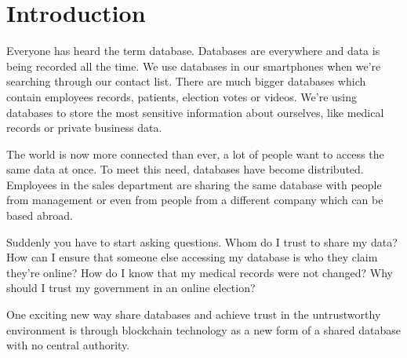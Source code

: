 \chapter*{Introduction}

Everyone has heard the term database. Databases are everywhere and data is being recorded all the time. We use databases in our smartphones when we're searching through our contact list. There are much bigger databases which contain employees records, patients, election votes or videos. We're using databases to store the most sensitive information about ourselves, like medical records or private business data. 

The world is now more connected than ever, a lot of people want to access the same data at once. To meet this need, databases have become distributed. Employees in the sales department are sharing the same database with people from management or even from people from a different company which can be based abroad.

Suddenly you have to start asking questions. Whom do I trust to share my data? How can I ensure that someone else accessing my database is who they claim they're online? How do I know that my medical records were not changed? Why should I trust my government in an online election? 

One exciting new way share databases and achieve trust in the untrustworthy environment is through blockchain technology as a new form of a shared database with no central authority. 

